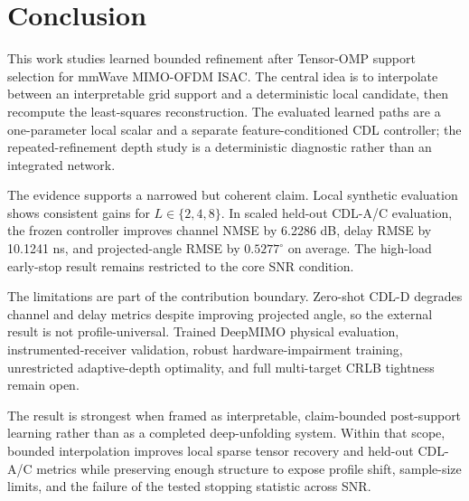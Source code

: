 \section{Conclusion}

This work studies learned bounded refinement after Tensor-OMP support selection for mmWave MIMO-OFDM ISAC. The central idea is to interpolate between an interpretable grid support and a deterministic local candidate, then recompute the least-squares reconstruction. The evaluated learned paths are a one-parameter local scalar and a separate feature-conditioned CDL controller; the repeated-refinement depth study is a deterministic diagnostic rather than an integrated network.

The evidence supports a narrowed but coherent claim. Local synthetic evaluation shows consistent gains for $L\in\{2,4,8\}$. In scaled held-out CDL-A/C evaluation, the frozen controller improves channel NMSE by 6.2286 dB, delay RMSE by 10.1241 ns, and projected-angle RMSE by $0.5277^\circ$ on average. The high-load early-stop result remains restricted to the core SNR condition.

The limitations are part of the contribution boundary. Zero-shot CDL-D degrades channel and delay metrics despite improving projected angle, so the external result is not profile-universal. Trained DeepMIMO physical evaluation, instrumented-receiver validation, robust hardware-impairment training, unrestricted adaptive-depth optimality, and full multi-target CRLB tightness remain open.

The result is strongest when framed as interpretable, claim-bounded post-support learning rather than as a completed deep-unfolding system. Within that scope, bounded interpolation improves local sparse tensor recovery and held-out CDL-A/C metrics while preserving enough structure to expose profile shift, sample-size limits, and the failure of the tested stopping statistic across SNR.
